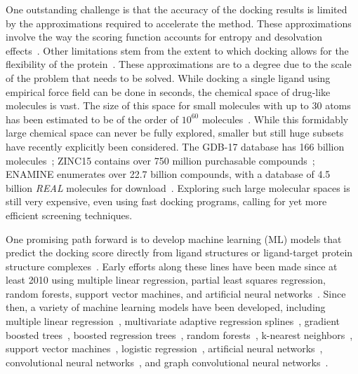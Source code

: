 \documentclass[conference]{IEEEtran}
\begin{document}
One outstanding challenge is that the accuracy of the docking results is limited by the approximations required to accelerate the method. 
These approximations involve the way the scoring function accounts for entropy and desolvation effects~\cite{Ferreira2015}. Other limitations stem from the extent to which docking allows for the flexibility of the protein~\cite{Ferreira2015}. These approximations are to a degree due to the scale of the problem that needs to be solved. While docking a single ligand using empirical force field can be done in seconds, the chemical space of drug-like molecules is vast. The size of this space for small molecules with up to 30 atoms has been estimated to be of the order of $10^{60}$ molecules~\cite{Bohacek1996}. While this formidably large chemical space can never be fully explored, smaller but still huge subsets have recently explicitly been considered. The GDB-17 database has 166 billion molecules~\cite{Ruddigkeit2012}; ZINC15 contains over 750 million purchasable compounds~\cite{ZINC15}; ENAMINE enumerates over 22.7 billion compounds, with a database of 4.5 billion {\it REAL} molecules for download~\cite{Enamine-REAL}. Exploring such large molecular spaces is still very expensive, even using fast docking programs, calling for yet more efficient screening techniques. 

One promising path forward is to develop machine learning (ML) models that predict the docking score directly from ligand structures or ligand-target protein structure complexes~\cite{khamis2015machine,crampon2021machine}. Early efforts along these lines have been made since at least 2010 using multiple linear regression, partial least squares regression, random forests, support vector machines, and artificial neural networks~\cite{Ballester2010}. Since then, a variety of machine learning models have been developed, including multiple linear regression~\cite{Ashtawy2015}, multivariate adaptive regression splines~\cite{Ashtawy2015}, gradient boosted trees~\cite{Bucinsky2022,Adeshina2020}, boosted regression trees~\cite{Ashtawy2015}, random forests~\cite{Fernandes2021,Hsin2013}, k-nearest neighbors~\cite{Chandak2020,Ashtawy2015}, support vector machines~\cite{Chandak2020,Ashtawy2015}, logistic regression~\cite{Chandak2020,Hsin2013}, artificial neural networks~\cite{gentile2020deep,Bucinsky2022}, convolutional neural networks~\cite{Ahmed2021,Shen2021deep,McNutt2021}, and graph convolutional neural networks~\cite{Bai2021,Morrone2020}.
\end{document}
